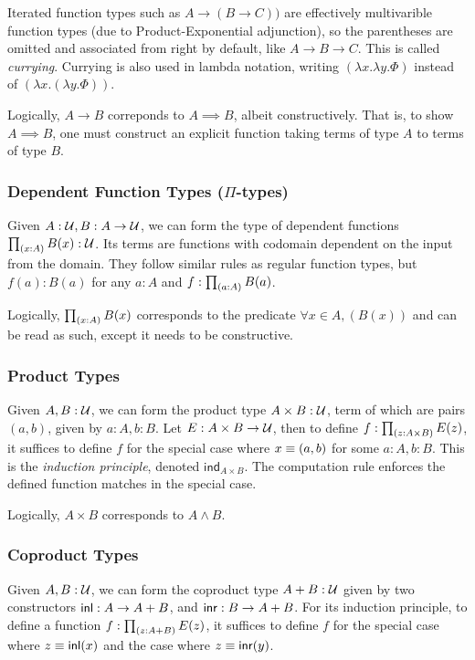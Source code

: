 Iterated function types such as $A \to (B \to C))$ are effectively multivarible function types (due to Product-Exponential adjunction),
so the parentheses are omitted and associated from right by default, like $A \to B \to C$. This is called \emph{currying}.
Currying is also used in lambda notation, writing $(\lambda x.\lambda y.\Phi)$ instead of $(\lambda x.(\lambda y.\Phi))$.

Logically, $A \to B$ correponds to $A \implies B$, albeit constructively. That is, to show $A \implies B$, one must construct
an explicit function taking terms of type $A$ to terms of type $B$.

\subsubsection{Dependent Function Types ($\Pi$-types)}
Given $A : \mathcal{U}, B : A \to \mathcal{U}$, we can form the type of dependent functions $\prod_{(x:A)}{B}(x) : \mathcal{U}$. Its terms are functions with
codomain dependent on the input from the domain. They follow similar rules as regular function types, but $f(a) : B(a)$
for any $a : A$ and  $f : \prod_{(a:A)}{B(a)}$.

Logically, $\prod_{(x:A)}{B(x)}$ corresponds to the predicate $\forall x \in A, (B(x))$ and can be read as such, except it needs to be constructive. 

\subsubsection{Product Types}
Given $A, B : \mathcal{U}$, we can form the product type $A \times B : \mathcal{U}$, term of which are pairs $(a, b)$, given by $a : A, b : B$. 
Let $E : A \times B \to \mathcal{U}$, then to define $f : \prod_{(z:A\times B)}{E(z)}$, it suffices to define $f$
for the special case where $x \equiv (a,b)$ for some $a : A, b : B$. This is the \textit{induction principle}, denoted
$\mathsf{ind}_{A\times B}$. The computation rule enforces the defined function matches in the special case.

Logically, $A \times B$ corresponds to $A \land B$.

\subsubsection{Coproduct Types}
Given $A, B : \mathcal{U}$, we can form the coproduct type $A + B : \mathcal{U}$ given by two constructors $\mathsf{inl} : A \to A + B$, and $\mathsf{inr} : B \to A + B$.
For its induction principle, to define a function $f : \prod_{(z : A + B)}{E}(z)$, it suffices to define $f$ for the 
special case where $z \equiv \mathsf{inl} (x)$ and the case where $z \equiv \mathsf{inr} (y)$.

